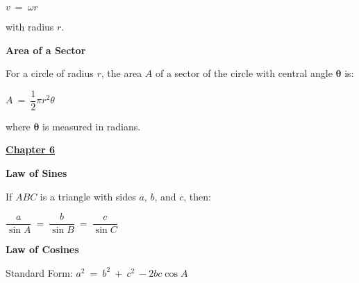 \documentclass{article}
\begin{document}
\begin{large}
\hspace{2.7in} $v\ =\ \omega r$

\vspace{-0.3in}

\hspace{0.1in} with radius $r$.

\textbf{Area of a Sector}

\vspace{-0.1in}

\hspace{0.1in} For a circle of radius $r$, the area $A$ of a sector of the circle with central angle $\boldsymbol{\theta}$ is:

\hspace{2.5in} $A\ =\ \dfrac{1}{2}\pi r^{2}\theta$

\vspace{-0.3in}

\hspace{0.1in} where $\boldsymbol{\theta}$ is measured in radians.






\vspace{0.15in}

\underline{\textbf{\huge Chapter 6 \phantom{ } \phantom{ } \phantom{ } \phantom{ }}}

\textbf{Law of Sines}

\hspace{0.1in} If $ABC$ is a triangle with sides $a$, $b$, and $c$, then:

\hspace{1.0in} $\dfrac{a}{\sin A}\ =\ \dfrac{b}{\sin B}\ =\ \dfrac{c}{\sin C}$

\textbf{Law of Cosines}

\hspace{0.1in} Standard Form: $a^{2}\ =\ b^{2}\ +\ c^{2}\ - 2bc\cos A$


\end{large}
\end{document}
